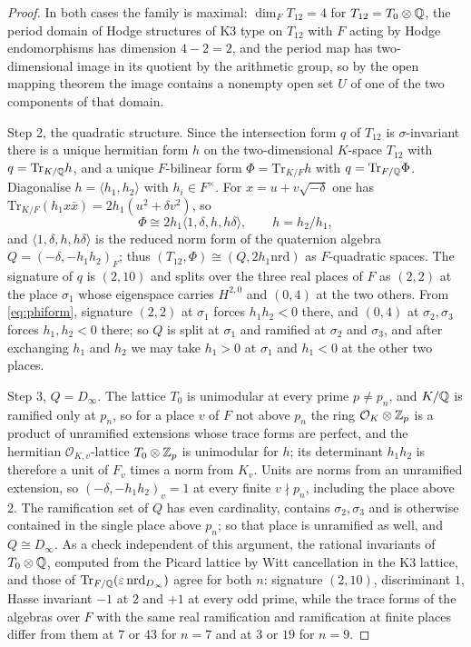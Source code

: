 \begin{proof}
In both cases the family is maximal: $\dim_{F}T_{12}=4$ for $T_{12}=T_{0}\otimes\mathbb{Q}$, the period domain of Hodge structures of K3 type on $T_{12}$ with $F$ acting by Hodge endomorphisms has dimension $4-2=2$, and the period map has two-dimensional image in its quotient by the arithmetic group, so by the open mapping theorem the image contains a nonempty open set $U$ of one of the two components of that domain.

Step 2, the quadratic structure. Since the intersection form $q$ of $T_{12}$ is $\sigma$-invariant there is a unique hermitian form $h$ on the two-dimensional $K$-space $T_{12}$ with $q=\mathrm{Tr}_{K/\mathbb{Q}}h$, and a unique $F$-bilinear form $\Phi=\mathrm{Tr}_{K/F}h$ with $q=\mathrm{Tr}_{F/\mathbb{Q}}\Phi$. Diagonalise $h=\langle h_{1},h_{2}\rangle$ with $h_{i}\in F^{\times}$. For $x=u+v\sqrt{-\delta}$ one has $\mathrm{Tr}_{K/F}(h_{1}x\bar x)=2h_{1}(u^{2}+\delta v^{2})$, so
\begin{equation}\label{eq:phiform}
\Phi\cong2h_{1}\langle1,\delta,h,h\delta\rangle,\qquad h=h_{2}/h_{1},
\end{equation}
and $\langle1,\delta,h,h\delta\rangle$ is the reduced norm form of the quaternion algebra $Q=(-\delta,-h_{1}h_{2})_{F}$; thus $(T_{12},\Phi)\cong(Q,2h_{1}\mathrm{nrd})$ as $F$-quadratic spaces. The signature of $q$ is $(2,10)$ and splits over the three real places of $F$ as $(2,2)$ at the place $\sigma_{1}$ whose eigenspace carries $H^{2,0}$ and $(0,4)$ at the two others. From \eqref{eq:phiform}, signature $(2,2)$ at $\sigma_{1}$ forces $h_{1}h_{2}<0$ there, and $(0,4)$ at $\sigma_{2},\sigma_{3}$ forces $h_{1},h_{2}<0$ there; so $Q$ is split at $\sigma_{1}$ and ramified at $\sigma_{2}$ and $\sigma_{3}$, and after exchanging $h_{1}$ and $h_{2}$ we may take $h_{1}>0$ at $\sigma_{1}$ and $h_{1}<0$ at the other two places.

Step 3, $Q=D_{\infty}$. The lattice $T_{0}$ is unimodular at every prime $p\ne p_{n}$, and $K/\mathbb{Q}$ is ramified only at $p_{n}$, so for a place $v$ of $F$ not above $p_{n}$ the ring $\mathcal{O}_{K}\otimes\mathbb{Z}_{p}$ is a product of unramified extensions whose trace forms are perfect, and the hermitian $\mathcal{O}_{K,v}$-lattice $T_{0}\otimes\mathbb{Z}_{p}$ is unimodular for $h$; its determinant $h_{1}h_{2}$ is therefore a unit of $F_{v}$ times a norm from $K_{v}$. Units are norms from an unramified extension, so $(-\delta,-h_{1}h_{2})_{v}=1$ at every finite $v\nmid p_{n}$, including the place above $2$. The ramification set of $Q$ has even cardinality, contains $\sigma_{2},\sigma_{3}$ and is otherwise contained in the single place above $p_{n}$; so that place is unramified as well, and $Q\cong D_{\infty}$. As a check independent of this argument, the rational invariants of $T_{0}\otimes\mathbb{Q}$, computed from the Picard lattice by Witt cancellation in the K3 lattice, and those of $\mathrm{Tr}_{F/\mathbb{Q}}(\varepsilon\,\mathrm{nrd}_{D_{\infty}})$ agree for both $n$: signature $(2,10)$, discriminant $1$, Hasse invariant $-1$ at $2$ and $+1$ at every odd prime, while the trace forms of the algebras over $F$ with the same real ramification and ramification at finite places differ from them at $7$ or $43$ for $n=7$ and at $3$ or $19$ for $n=9$.


\end{proof}
